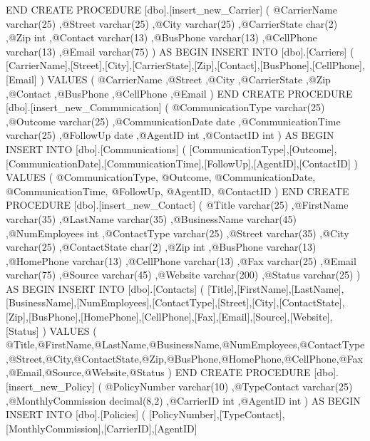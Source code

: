 END
CREATE PROCEDURE [dbo].[insert_new_Carrier]
(
		    @CarrierName varchar(25)
           ,@Street varchar(25)
           ,@City varchar(25)
           ,@CarrierState char(2)
           ,@Zip int
           ,@Contact varchar(13)
           ,@BusPhone varchar(13)
           ,@CellPhone varchar(13)
           ,@Email varchar(75)
		   ) AS BEGIN 
	   INSERT INTO [dbo].[Carriers]
	(
		[CarrierName],[Street],[City],[CarrierState],[Zip],[Contact],[BusPhone],[CellPhone],[Email]
	)
     VALUES
	(
		@CarrierName ,@Street ,@City ,@CarrierState ,@Zip ,@Contact ,@BusPhone ,@CellPhone ,@Email 
	)
END
CREATE PROCEDURE [dbo].[insert_new_Communication]
		(
		    @CommunicationType varchar(25)
           ,@Outcome varchar(25)
           ,@CommunicationDate date
           ,@CommunicationTime varchar(25)
           ,@FollowUp date
           ,@AgentID int
           ,@ContactID int
		) AS BEGIN	
INSERT INTO [dbo].[Communications]
	(
		[CommunicationType],[Outcome],[CommunicationDate],[CommunicationTime],[FollowUp],[AgentID],[ContactID]
	)
     VALUES
	(
		@CommunicationType, @Outcome, @CommunicationDate, @CommunicationTime, @FollowUp, @AgentID, @ContactID 
	)
END
CREATE PROCEDURE [dbo].[insert_new_Contact]
			(
			@Title varchar(25)
           ,@FirstName varchar(35)
           ,@LastName varchar(35)
           ,@BusinessName varchar(45)
           ,@NumEmployees int
           ,@ContactType varchar(25)
           ,@Street varchar(35)
           ,@City varchar(25)
           ,@ContactState char(2)
           ,@Zip int
           ,@BusPhone varchar(13)
           ,@HomePhone varchar(13)
           ,@CellPhone varchar(13)
           ,@Fax varchar(25)
           ,@Email varchar(75)
           ,@Source varchar(45)
           ,@Website varchar(200)
           ,@Status varchar(25)
		   ) AS BEGIN 
	   INSERT INTO [dbo].[Contacts]
           (
[Title],[FirstName],[LastName],[BusinessName],[NumEmployees],[ContactType],[Street],[City],[ContactState],[Zip],[BusPhone],[HomePhone],[CellPhone],[Fax],[Email],[Source],[Website],[Status]
		   )
     VALUES
           (
@Title,@FirstName,@LastName,@BusinessName,@NumEmployees,@ContactType,@Street,@City,@ContactState,@Zip,@BusPhone,@HomePhone,@CellPhone,@Fax,@Email,@Source,@Website,@Status 
		   )
END
CREATE PROCEDURE [dbo].[insert_new_Policy]
		(
		   @PolicyNumber varchar(10)
           ,@TypeContact varchar(25)
           ,@MonthlyCommission decimal(8,2)
           ,@CarrierID int
           ,@AgentID int
		) AS BEGIN 
	INSERT INTO [dbo].[Policies]
           (
		   [PolicyNumber],[TypeContact],[MonthlyCommission],[CarrierID],[AgentID]
